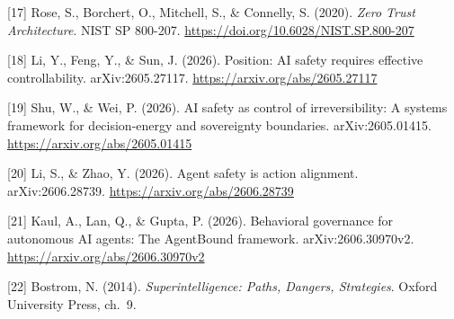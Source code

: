 {[}17{]} Rose, S., Borchert, O., Mitchell, S., \& Connelly, S. (2020). \emph{Zero Trust Architecture}. NIST SP 800-207. \url{https://doi.org/10.6028/NIST.SP.800-207}

{[}18{]} Li, Y., Feng, Y., \& Sun, J. (2026). Position: AI safety requires effective controllability. arXiv:2605.27117. \url{https://arxiv.org/abs/2605.27117}

{[}19{]} Shu, W., \& Wei, P. (2026). AI safety as control of irreversibility: A systems framework for decision-energy and sovereignty boundaries. arXiv:2605.01415. \url{https://arxiv.org/abs/2605.01415}

{[}20{]} Li, S., \& Zhao, Y. (2026). Agent safety is action alignment. arXiv:2606.28739. \url{https://arxiv.org/abs/2606.28739}

{[}21{]} Kaul, A., Lan, Q., \& Gupta, P. (2026). Behavioral governance for autonomous AI agents: The AgentBound framework. arXiv:2606.30970v2. \url{https://arxiv.org/abs/2606.30970v2}

{[}22{]} Bostrom, N. (2014). \emph{Superintelligence: Paths, Dangers, Strategies}. Oxford University Press, ch.~9.
